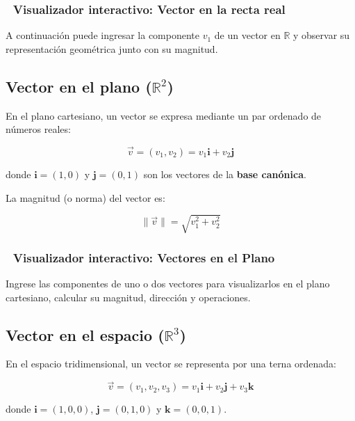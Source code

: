 \documentclass[
]{book}
\begin{document}
\subsubsection{🧮 Visualizador interactivo: Vector en la recta real}\label{visualizador-interactivo-vector-en-la-recta-real}

A continuación puede ingresar la componente \(v_1\) de un vector en \(\mathbb{R}\) y observar su representación geométrica junto con su magnitud.

\subsection{\texorpdfstring{Vector en el plano (\(\mathbb{R}^2\))}{Vector en el plano (\textbackslash mathbb\{R\}\^{}2)}}\label{vector-en-el-plano-mathbbr2}

En el plano cartesiano, un vector se expresa mediante un par ordenado de números reales:

\[
\vec{v} = (v_1, v_2) = v_1 \mathbf{i} + v_2 \mathbf{j}
\]

donde \(\mathbf{i} = (1, 0)\) y \(\mathbf{j} = (0, 1)\) son los vectores de la \textbf{base canónica}.

La magnitud (o norma) del vector es:

\[
\|\vec{v}\| = \sqrt{v_1^2 + v_2^2}
\]

\subsubsection{🧮 Visualizador interactivo: Vectores en el Plano}\label{visualizador-interactivo-vectores-en-el-plano}

Ingrese las componentes de uno o dos vectores para visualizarlos en el plano cartesiano, calcular su magnitud, dirección y operaciones.

\subsection{\texorpdfstring{Vector en el espacio (\(\mathbb{R}^3\))}{Vector en el espacio (\textbackslash mathbb\{R\}\^{}3)}}\label{vector-en-el-espacio-mathbbr3}

En el espacio tridimensional, un vector se representa por una terna ordenada:

\[
\vec{v} = (v_1, v_2, v_3) = v_1 \mathbf{i} + v_2 \mathbf{j} + v_3 \mathbf{k}
\]

donde \(\mathbf{i} = (1, 0, 0)\), \(\mathbf{j} = (0, 1, 0)\) y \(\mathbf{k} = (0, 0, 1)\).
\end{document}
